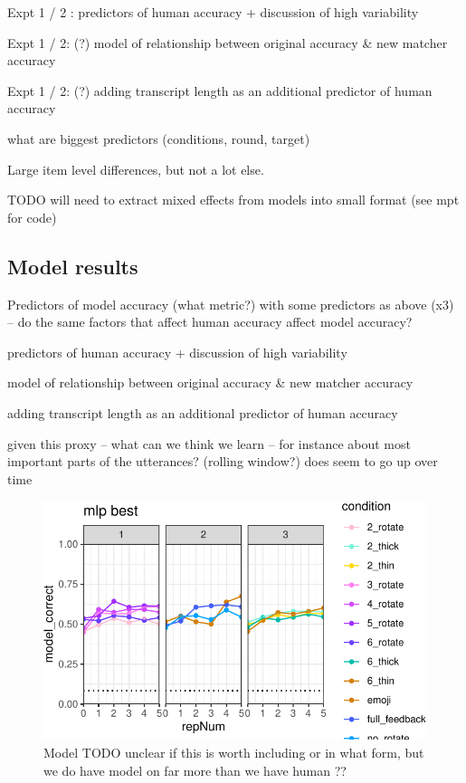 \documentclass[10pt, letterpaper]{article}
\begin{document}
Expt 1 / 2 : predictors of human accuracy + discussion of high
variability

Expt 1 / 2: (?) model of relationship between original accuracy \& new
matcher accuracy

Expt 1 / 2: (?) adding transcript length as an additional predictor of
human accuracy

what are biggest predictors (conditions, round, target)

Large item level differences, but not a lot else.

TODO will need to extract mixed effects from models into small format
(see mpt for code)

\subsection{Model results}\label{model-results}

Predictors of model accuracy (what metric?) with some predictors as
above (x3) -- do the same factors that affect human accuracy affect
model accuracy?

predictors of human accuracy + discussion of high variability

model of relationship between original accuracy \& new matcher accuracy

adding transcript length as an additional predictor of human accuracy

given this proxy -- what can we think we learn -- for instance about
most important parts of the utterances? (rolling window?) does seem to
go up over time

\begin{CodeChunk}
\begin{figure}[t]

{\centering \includegraphics[width=1\linewidth]{figs/fig-4-1} 

}

\caption[Model TODO unclear if this is worth including or in what form, but we do have model on far more than we have human ??]{Model TODO unclear if this is worth including or in what form, but we do have model on far more than we have human ??}\label{fig:fig-4}
\end{figure}
\end{CodeChunk}
\end{document}
